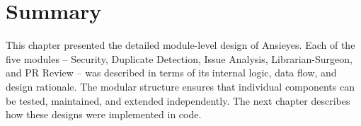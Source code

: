 \section{Summary}

This chapter presented the detailed module-level design of Ansieyes. Each of the five modules -- Security, Duplicate Detection, Issue Analysis, Librarian-Surgeon, and PR Review -- was described in terms of its internal logic, data flow, and design rationale. The modular structure ensures that individual components can be tested, maintained, and extended independently. The next chapter describes how these designs were implemented in code.
